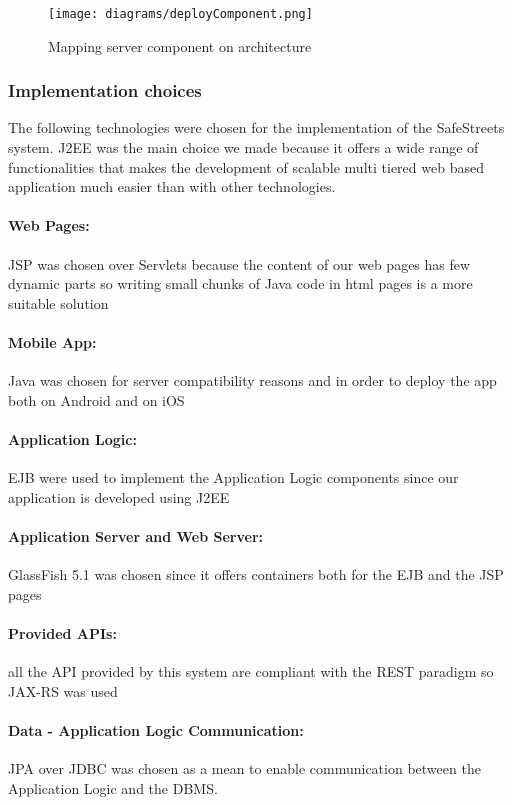 \begin{figure}[h]
			\centering
			\texttt{[image: diagrams/deployComponent.png]}
			\caption{
				\label{fig:deployServerComponent} 
				Mapping server component on architecture
			}
		\end{figure}
\clearpage

\label{sec:implementationChoices}
\subsubsection{Implementation choices}
The following technologies were chosen for the implementation of the SafeStreets system. J2EE was the main choice we made because it offers a wide range of functionalities that makes the development of scalable multi tiered web based application much easier than with other technologies.

\paragraph{Web Pages:} JSP was chosen over Servlets because the content of our web pages has few dynamic parts so writing small chunks of Java code in html pages is a more suitable solution
\paragraph{Mobile App:} Java was chosen for server compatibility reasons and in order to deploy the app both on Android and on iOS
\paragraph{Application Logic:} EJB were used to implement the Application Logic components since our application is developed using J2EE
\paragraph{Application Server and Web Server:} GlassFish 5.1 was chosen since it offers containers both for the EJB and the JSP pages 
\paragraph{Provided APIs:} all the API provided by this system are compliant with the REST paradigm so JAX-RS was used
\paragraph{Data - Application Logic Communication:} JPA over JDBC was chosen as a mean to enable communication between the Application Logic and the DBMS.

